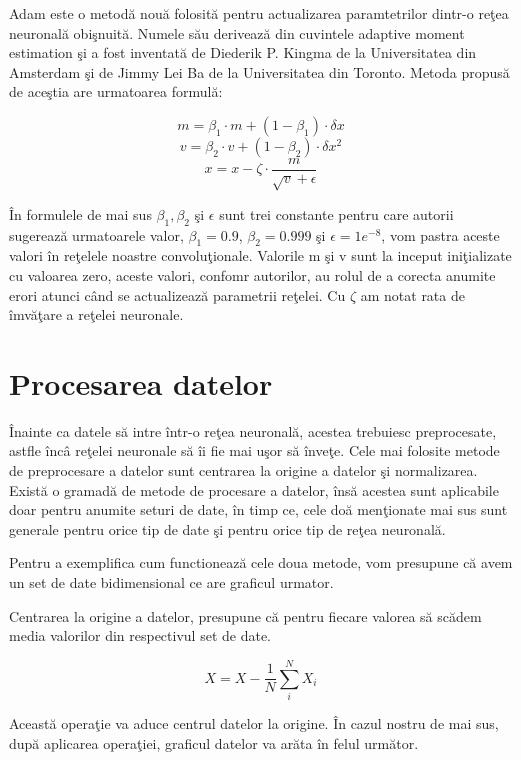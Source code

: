 Adam este o metod\u{a} nou\u{a} folosit\u{a} pentru actualizarea paramtetrilor dintr-o re\c{t}ea neuronal\u{a} obi\c{s}nuit\u{a}. Numele s\u{a}u deriveaz\u{a} din cuvintele adaptive moment estimation \c{s}i a fost inventat\u{a} de Diederik P. Kingma de la Universitatea din Amsterdam \c{s}i de Jimmy Lei Ba de la Universitatea din Toronto. Metoda propus\u{a} de ace\c{s}tia are urmatoarea formul\u{a}:

$$ m = \beta_1 \cdot m + ( 1 - \beta_1 ) \cdot \delta x $$
$$ v = \beta_2 \cdot v + ( 1- \beta_2 ) \cdot \delta x^2 $$
$$ x = x - \zeta \cdot \frac{m}{\sqrt{v} + \epsilon } $$

\^{I}n formulele de mai sus $\beta_1, \beta_2 $ \c{s}i $ \epsilon $ sunt trei constante pentru care autorii sugereaz\u{a} urmatoarele valor, $\beta_1 = 0.9 $, $\beta_2 = 0.999 $ \c{s}i $ \epsilon = 1e^{-8} $, vom pastra aceste valori \^{i}n re\c{t}elele noastre convolu\c{t}ionale. Valorile m \c{s}i v sunt la inceput ini\c{t}ializate cu valoarea zero, aceste valori, confomr autorilor, au rolul de a corecta anumite erori atunci c\^{a}nd se actualizeaz\u{a} parametrii re\c{t}elei. Cu $\zeta$ am notat rata de \^{i}mv\u{a}\c{t}are a re\c{t}elei neuronale.

\section{Procesarea datelor}

\^{I}nainte ca datele s\u{a} intre \^{i}ntr-o re\c{t}ea neuronal\u{a}, acestea trebuiesc preprocesate, astfle \^{i}nc\^{a} re\c{t}elei neuronale s\u{a} \^{i}i fie mai u\c{s}or s\u{a} \^{i}nve\c{t}e. Cele mai folosite metode de preprocesare a datelor sunt centrarea la origine a datelor \c{s}i normalizarea. Exist\u{a} o gramad\u{a} de metode de procesare a datelor, \^{i}ns\u{a} acestea sunt aplicabile doar pentru anumite seturi de date, \^{i}n timp ce, cele do\u{a} men\c{t}ionate mai sus sunt generale pentru orice tip de date \c{s}i pentru orice tip de re\c{t}ea neuronal\u{a}.

Pentru a exemplifica cum functioneaz\u{a} cele doua metode, vom presupune c\u{a} avem un set de date bidimensional ce are graficul urmator.

Centrarea la origine a datelor, presupune c\u{a} pentru fiecare valorea s\u{a} sc\u{a}dem media valorilor din respectivul set de date.

            $$ X = X - \frac{1}{N}\sum_i^N X_i$$
            
Aceast\u{a} opera\c{t}ie va aduce centrul datelor la origine. \^{I}n cazul nostru de mai sus, dup\u{a} aplicarea opera\c{t}iei, graficul datelor va ar\u{a}ta \^{i}n felul urm\u{a}tor.

